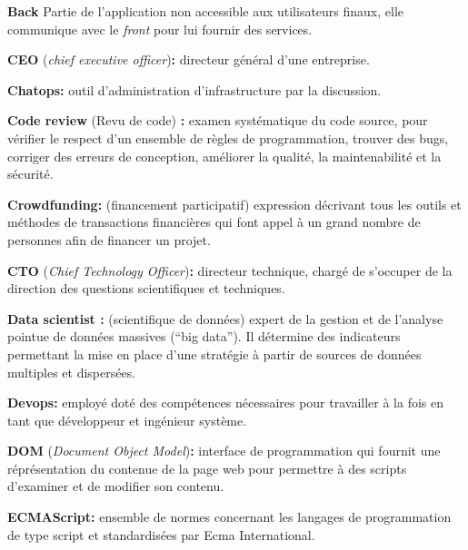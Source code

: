 \bigskip

\textbf{Back} Partie de l'application non accessible aux utilisateurs
finaux, elle communique avec le \emph{front} pour lui fournir des
services.

\bigskip

\textbf{CEO} (\emph{chief executive officer})\textbf{:} directeur
général d'une entreprise.

\bigskip

\textbf{Chatops:} outil d'administration d'infrastructure par la
discussion.

\bigskip

\textbf{Code review} (Revu de code) \textbf{:} examen systématique du
code source, pour vérifier le respect d'un ensemble de règles de
programmation, trouver des bugs, corriger des erreurs de conception,
améliorer la qualité, la maintenabilité et la sécurité.

\bigskip

\textbf{Crowdfunding:} (financement participatif) expression décrivant
tous les outils et méthodes de transactions financières qui font appel à
un grand nombre de personnes afin de financer un projet.

\bigskip

\textbf{CTO} (\emph{Chief Technology Officer})\textbf{:} directeur
technique, chargé de s'occuper de la direction des questions
scientifiques et techniques.

\bigskip

\textbf{Data scientist :} (scientifique de données) expert de la gestion
et de l'analyse pointue de données massives (``big data''). Il détermine
des indicateurs permettant la mise en place d'une stratégie à partir de
sources de données multiples et dispersées.

\bigskip

\textbf{Devops:} employé doté des compétences nécessaires pour
travailler à la fois en tant que développeur et ingénieur système.

\bigskip

\textbf{DOM} (\emph{Document Object Model})\textbf{:} interface de
programmation qui fournit une réprésentation du contenue de la page web
pour permettre à des scripts d'examiner et de modifier son contenu.

\bigskip

\textbf{ECMAScript:} ensemble de normes concernant les langages de
programmation de type script et standardisées par Ecma International.

\bigskip

